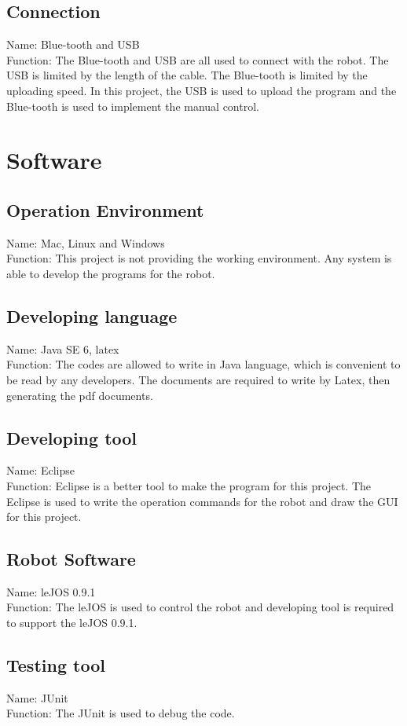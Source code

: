 \documentclass[11pt, a4paper]{report}
\begin{document}
\subsection{Connection}
Name: Blue-tooth and USB \\
Function: The Blue-tooth and USB are all used to connect with the robot. The USB is limited by the length of the cable. The Blue-tooth is limited by the uploading speed. In this project, the USB is used to upload the program and the Blue-tooth is used to implement the manual control.
\section{Software}
\subsection{Operation Environment}
Name: Mac, Linux and Windows\\
Function: This project is not providing the working environment. Any system is able to develop the programs for the robot.
\subsection{Developing language}
Name: Java SE 6, latex\\
Function: The codes are allowed to write in Java language, which is convenient to be read by any developers. The documents are required to write by Latex, then generating the pdf documents.
\subsection{Developing tool}
Name: Eclipse\\
Function: Eclipse is a better tool to make the program for this project. The Eclipse is used to write the operation commands for the robot and draw the GUI for this project.
\subsection{Robot Software}
Name: leJOS 0.9.1\\
 Function: The leJOS is used to control the robot and developing tool is required to support the leJOS 0.9.1.
 \subsection{Testing tool}
 Name: JUnit\\
 Function: The JUnit is used to debug the code.
\end{document}
